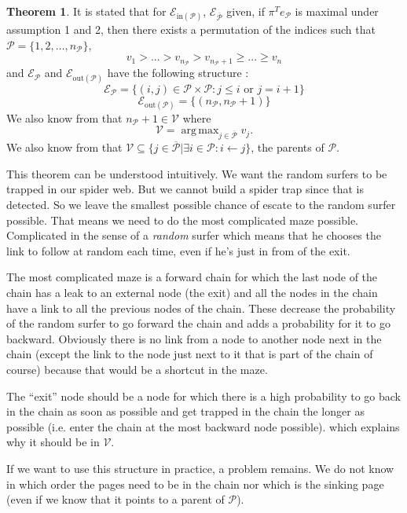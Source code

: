 \documentclass{article}
\DeclareMathOperator*{\argmax}{arg\,max}
\newcommand{\1}{\mathbf{1}}
\theoremstyle{definition}
\newtheorem{mytheo}[mydef]{Theorem}
\begin{document}
\begin{mytheo}
  It is stated that for \(\mathcal{E}_{\text{in}(\mathcal{P})}\), \(\mathcal{E}_{\overline{\mathcal{P}}}\) given, if  \(\pi^T e_{\mathcal{P}}\) is maximal under assumption 1 and 2, then there exists a permutation of the indices such that
\(\mathcal{P} = \{1,2, \hdots, n_{\mathcal{P}}\}\),
\[ v_1 > ... > v_{n_\mathcal{P}}>v_{n_{\mathcal{P}}+1} \geq ... \geq v_n\]
and \(\mathcal{E}_{\mathcal{P}}\) and \(\mathcal{E}_{\text{out}(\mathcal{P})} \) have the following structure :
\[\mathcal{E}_{\mathcal{P}} = \{(i,j) \in \mathcal{P}\times \mathcal{P} : j \leq i \text{ or }j = i+1 \}\]
\[\mathcal{E}_{\text{out}(\mathcal{P})} = \{(n_{\mathcal{P}},n_{\mathcal{P}}+1)\}\]
We also know from \cite{de2008maximizing} that \(n_\mathcal{P}+1 \in \mathcal{V}\) where
\[ \mathcal{V} = \argmax_{j \in \overline{\mathcal{P}}} v_j. \]
We also know from \cite{de2008maximizing} that \(\mathcal{V} \subseteq \{j \in \overline{\mathcal{P}} | \exists i \in \mathcal{P} : i \leftarrow j\}\), the parents of \(\mathcal{P}\).
\label{thm:optstruct}
\end{mytheo}

This theorem can be understood intuitively.
We want the random surfers to be trapped in our spider web.
But we cannot build a spider trap since that is detected.
So we leave the smallest possible chance of escate to the random surfer possible.
That means we need to do the most complicated maze possible.
Complicated in the sense of a \emph{random} surfer which means that he chooses
the link to follow at random each time, even if he's just in from of the exit.

The most complicated maze is a forward chain for which the last node of the chain has a leak to an external node (the exit)
and all the nodes in the chain have a link to all the previous nodes of the chain.
These decrease the probability of the random surfer to go forward the chain and adds a probability for it to go backward.
Obviously there is no link from a node to another node next in the chain (except the link to the node just next to it that is part of the chain of course) because that would be a shortcut in the maze.

The ``exit'' node should be a node for which there is a high probability to go back in the chain as soon as possible and get trapped in the chain the longer as possible (i.e. enter the chain at the most backward node possible).
which explains why it should be in $\mathcal{V}$.

If we want to use this structure in practice, a problem remains.
We do not know in which order the pages need to be in the chain
nor which is the sinking page (even if we know that it points to a parent of \(\mathcal{P}\)).
\end{document}
